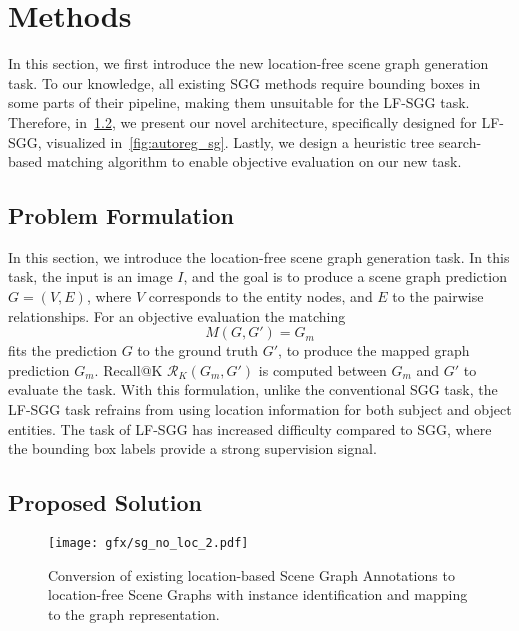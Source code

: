 \documentclass[10pt,twocolumn,letterpaper]{article}
\begin{document}
 \section{Methods} 

In this section, we first introduce the new location-free scene graph generation task. To our knowledge, all existing SGG methods require bounding boxes in some parts of their pipeline, making them unsuitable for the LF-SGG task. Therefore, in~\cref{sec:prop_solution}, we present our novel architecture, specifically designed for LF-SGG, visualized in~\cref{fig:autoreg_sg}. Lastly, we design a heuristic tree search-based matching algorithm to enable objective evaluation on our new task.

\subsection{Problem Formulation}
\noindent
In this section, we introduce the location-free scene graph generation task. In this task, the input is an image $I$, and the goal is to produce a scene graph prediction $G = (V,E)$, where $V$ corresponds to the entity nodes, and $E$ to the pairwise relationships. For an objective evaluation the matching
\begin{equation} \label{graph_matching}
M\left( G,G' \right) = G_{m}
\end{equation}
 fits the prediction $G$ to the ground truth $G'$, to produce the mapped graph prediction $G_{m}$.
Recall@K $\mathcal{R}_K \left( G_{m},G' \right)$ is computed between $G_{m}$ and $G'$ to evaluate the task. With this formulation, unlike the conventional SGG task, the LF-SGG task refrains from using location information for both subject and object entities. The task of LF-SGG has increased difficulty compared to SGG, where the bounding box labels provide a strong supervision signal.

\subsection{Proposed Solution}
\label{sec:prop_solution}

\begin{figure}[t]
  \centering
  
   \texttt{[image: gfx/sg\_no\_loc\_2.pdf]}

   \caption{Conversion of existing location-based Scene Graph Annotations to location-free Scene Graphs with instance identification and mapping to the graph representation.}
   \label{fig:sg_no_loc}
\end{figure}
\end{document}
